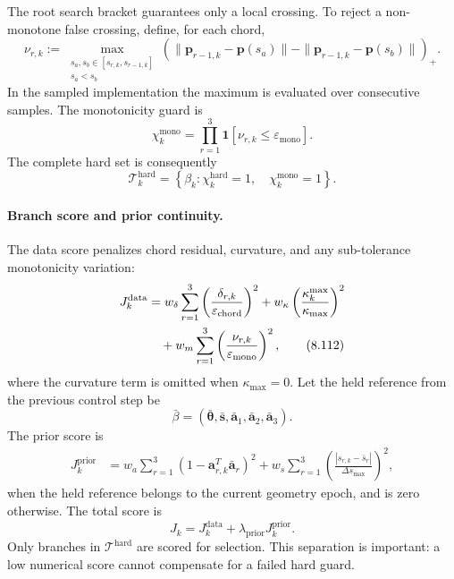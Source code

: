\documentclass[12pt,a4paper]{report}
\begin{document}
The root search bracket guarantees only a local crossing. To reject a
non-monotone false crossing, define, for each chord,
\begin{equation}
\nu_{r,k}:=
\max_{\substack{s_a,s_b\in[s_{r,k},s_{r-1,k}]\\s_a<s_b}}
\left(
\|\mathbf{p}_{r-1,k}-\mathbf{p}(s_a)\|
-\|\mathbf{p}_{r-1,k}-\mathbf{p}(s_b)\|
\right)_+ .
\tag{8.109}
\label{eq:ch8-monotonicity-violation}
\end{equation}
In the sampled implementation the maximum is evaluated over consecutive
samples. The monotonicity guard is
\begin{equation}
\chi_k^{\mathrm{mono}}
=\prod_{r=1}^{3}
\mathbf{1}\!\left[
\nu_{r,k}\leq\varepsilon_{\mathrm{mono}}
\right].
\tag{8.110}
\label{eq:ch8-monotonicity-guard}
\end{equation}
The complete hard set is consequently
\begin{equation}
\mathcal{T}_k^{\mathrm{hard}}
=\left\{\beta_k:
\chi_k^{\mathrm{hard}}=1,\quad
\chi_k^{\mathrm{mono}}=1\right\}.
\tag{8.111}
\label{eq:ch8-hard-set}
\end{equation}

\paragraph{Branch score and prior continuity.}
The data score penalizes chord residual, curvature, and any sub-tolerance
monotonicity variation:
\begin{align}
J_k^{\mathrm{data}}
&=w_\delta\sum_{r=1}^{3}
\left(\frac{\delta_{r,k}}{\varepsilon_{\mathrm{chord}}}\right)^2
+w_\kappa
\left(\frac{\kappa_k^{\max}}{\kappa_{\max}}\right)^2 \notag\\
&\quad
+w_m\sum_{r=1}^{3}
\left(\frac{\nu_{r,k}}{\varepsilon_{\mathrm{mono}}}\right)^2 ,
\tag{8.112}
\label{eq:ch8-data-score}
\end{align}
where the curvature term is omitted when $\kappa_{\max}=0$. Let the held
reference from the previous control step be
\[
\bar\beta=(\bar{\boldsymbol{\theta}},\bar{\mathbf{s}},
\bar{\mathbf{a}}_1,\bar{\mathbf{a}}_2,\bar{\mathbf{a}}_3).
\]
The prior score is
\begin{align}
J_k^{\mathrm{prior}}
&=w_a\sum_{r=1}^{3}
\left(1-\mathbf{a}_{r,k}^{T}\bar{\mathbf{a}}_r\right)^2
+w_s\sum_{r=1}^{3}
\left(\frac{|s_{r,k}-\bar s_r|}
{\Delta s_{\max}}\right)^2 ,
\tag{8.113}
\label{eq:ch8-prior-score}
\end{align}
when the held reference belongs to the current geometry epoch, and is zero
otherwise. The total score is
\begin{equation}
J_k=J_k^{\mathrm{data}}+\lambda_{\mathrm{prior}}
J_k^{\mathrm{prior}} .
\tag{8.114}
\label{eq:ch8-total-score}
\end{equation}
Only branches in $\mathcal{T}^{\mathrm{hard}}$ are scored for selection.
This separation is important: a low numerical score cannot compensate for a
failed hard guard.
\end{document}
